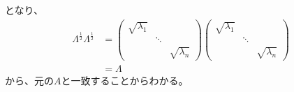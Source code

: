 となり、
\begin{align*}
  \Lambda^{\frac{1}{2}} \Lambda^{\frac{1}{2}} & = \left(
                                                    \begin{array}{ccc}
                                                      \sqrt{\lambda_1} &        & \\
                                                                       & \ddots & \\
                                                                       &        & \sqrt{\lambda_n}
                                                    \end{array}
                                                  \right)
                                                  \left(
                                                    \begin{array}{ccc}
                                                      \sqrt{\lambda_1} &        & \\
                                                                       & \ddots & \\
                                                                       &        & \sqrt{\lambda_n}
                                                    \end{array}
                                                  \right) \\
                                              & = \Lambda
\end{align*}
から、元の$A$と一致することからわかる。

